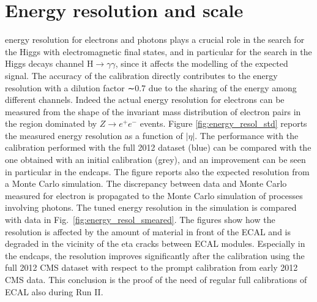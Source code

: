 \documentclass[journal]{IEEEtran}
\begin{document}
\section{Energy resolution and scale}
 energy resolution for electrons and photons plays a crucial role in the search for the Higgs with electromagnetic final states, and in particular for the search in the Higgs decays channel H$\to\gamma\gamma$, since it affects the modelling of the expected signal. The accuracy of the calibration directly contributes to the energy resolution with a dilution factor ∼0.7 due to the sharing of the energy among different channels. Indeed the actual energy resolution for electrons can be measured from the shape of the invariant mass distribution of electron pairs in the region dominated by $Z\to e^+e^-$ events. Figure \ref{fig:energy_resol_std} reports the measured energy resolution as a function of  $\vert\eta\vert$. The performance with the calibration performed with the full 2012 dataset (blue) can be compared with the one obtained with an initial calibration (grey), and an improvement can be seen in particular in the endcaps. The figure reports also the expected resolution from a Monte Carlo simulation. The discrepancy between data and Monte Carlo measured for electron is propagated to the Monte Carlo simulation of processes involving photons. The tuned energy resolution in the simulation is compared with data in Fig.~\ref{fig:energy_resol_smeared}.  The figures show how the resolution is affected by the amount of material in front of the ECAL and is degraded in the vicinity of the eta cracks between ECAL modules.  Especially in the endcaps, the resolution improves significantly after the calibration using the full 2012 CMS dataset with respect to the prompt calibration from early 2012 CMS data. This conclusion is the proof of the need of regular full calibrations of ECAL also during Run II. 
%
\end{document}
